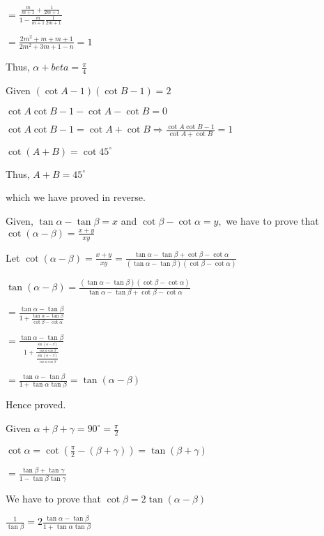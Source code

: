   $= \frac{\frac{m}{m + 1} + \frac{1}{2m + 1}}{1 - \frac{m}{m + 1}\frac{1}{2m + 1}}$

  $= \frac{2m^2 + m + m + 1}{2m^2 + 3m + 1 - n} = 1$

  Thus, $\alpha + beta = \frac{\pi}{4}$

\item Given $(\cot A - 1)(\cot B - 1) = 2$

  $\cot A\cot B - 1 - \cot A - \cot B = 0$

  $\cot A\cot B - 1 = \cot A + \cot B \Rightarrow \frac{\cot A\cot B - 1}{\cot A + \cot B} = 1$

  $\cot(A + B) = \cot 45^\circ$

  Thus, $A + B = 45^\circ$

  which we have proved in reverse.

\item Given, $\tan\alpha - \tan\beta = x$ and $\cot\beta - \cot\alpha = y,$ we have to prove that $\cot(\alpha -
  \beta) = \frac{x + y}{xy}$

  Let $\cot(\alpha - \beta) = \frac{x + y}{xy} = \frac{\tan\alpha - \tan\beta + \cot\beta - \cot\alpha}{(\tan\alpha -
    \tan\beta)(\cot\beta - \cot\alpha)}$

  $\tan(\alpha - \beta) = \frac{(\tan\alpha - \tan\beta)(\cot\beta - \cot\alpha)}{\tan\alpha - \tan\beta + \cot\beta -
    \cot\alpha}$

  $= \frac{\tan\alpha - \tan\beta}{1 + \frac{\tan\alpha - \tan\beta}{\cot\beta - \cot \alpha}}$

  $= \frac{\tan\alpha - \tan\beta}{ 1 + \frac{\frac{\sin(\alpha - \beta)}{\cos\alpha\cos\beta}}{\frac{\sin(\alpha -
        \beta)}{\cos\alpha\cos\beta}}}$

  $= \frac{\tan\alpha - \tan\beta}{1 + \tan\alpha\tan\beta} = \tan(\alpha - \beta)$

  Hence proved.

\item Given $\alpha + \beta + \gamma = 90^\circ = \frac{\pi}{2}$

  $\cot \alpha = \cot\left(\frac{\pi}{2} - (\beta + \gamma)\right) = \tan(\beta + \gamma)$

  $= \frac{\tan\beta + \tan\gamma}{1 - \tan\beta\tan\gamma}$

\item We have to prove that $\cot \beta = 2\tan(\alpha - \beta)$

  $\frac{1}{\tan\beta} = 2\frac{\tan\alpha - \tan\beta}{1 + \tan\alpha\tan\beta}$


